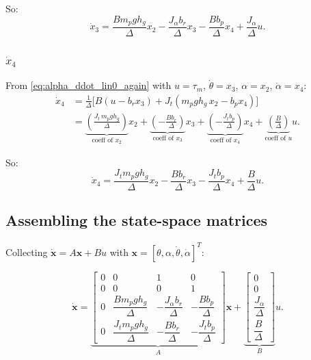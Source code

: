 \documentclass[12pt,a4paper]{article}
\begin{document}
So:
\[
\boxed{
\dot x_3
=
\frac{B m_p g h_g}{\Delta}x_2
-\frac{J_\alpha b_r}{\Delta}x_3
-\frac{B b_p}{\Delta}x_4
+\frac{J_\alpha}{\Delta}u.
}
\]

\subsubsection{$\dot x_4$}

From \eqref{eq:alpha_ddot_lin0_again} with $u=\tau_m$, $\dot\theta=x_3$, $\alpha=x_2$, $\dot\alpha=x_4$:
\begin{align*}
\dot x_4
&=
\frac{1}{\Delta}\Big[B(u-b_r x_3)+J_t(m_p g h_g\,x_2-b_p x_4)\Big]\\[4pt]
&=
\underbrace{\left(\frac{J_t\,m_p g h_g}{\Delta}\right)}_{\text{coeff of }x_2}x_2
+\underbrace{\left(-\frac{B b_r}{\Delta}\right)}_{\text{coeff of }x_3}x_3
+\underbrace{\left(-\frac{J_t b_p}{\Delta}\right)}_{\text{coeff of }x_4}x_4
+\underbrace{\left(\frac{B}{\Delta}\right)}_{\text{coeff of }u}u.
\end{align*}

So:
\[
\boxed{
\dot x_4
=
\frac{J_t m_p g h_g}{\Delta}x_2
-\frac{B b_r}{\Delta}x_3
-\frac{J_t b_p}{\Delta}x_4
+\frac{B}{\Delta}u.
}
\]

\subsection{Assembling the state-space matrices}

Collecting
$\dot{\bm x} = A\bm x + B u$ with $\bm x=[\theta,\alpha,\dot\theta,\dot\alpha]^T$:

\[
\boxed{
\dot{\bm x}
=
\underbrace{
\begin{bmatrix}
0 & 0 & 1 & 0\\
0 & 0 & 0 & 1\\
0 & \dfrac{B m_p g h_g}{\Delta} & -\dfrac{J_\alpha b_r}{\Delta} & -\dfrac{B b_p}{\Delta}\\
0 & \dfrac{J_t m_p g h_g}{\Delta} & -\dfrac{B b_r}{\Delta} & -\dfrac{J_t b_p}{\Delta}
\end{bmatrix}
}_{A}
\bm x
+
\underbrace{
\begin{bmatrix}
0\\
0\\
\dfrac{J_\alpha}{\Delta}\\
\dfrac{B}{\Delta}
\end{bmatrix}
}_{B}
u.
}
\]

\end{document}

